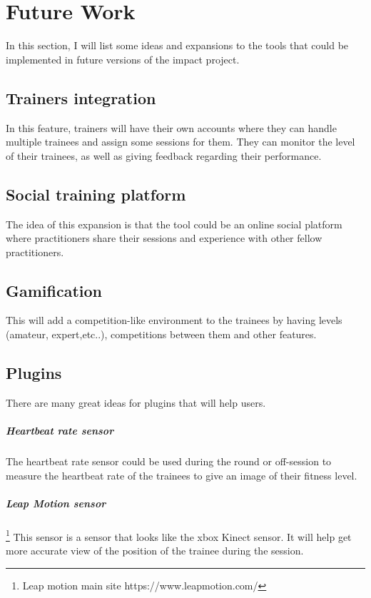\chapter{Future Work}
\label{chap:todo}

In this section, I will list some ideas and expansions to the tools that could be implemented in future versions of the impact project.

\section{Trainers integration}
In this feature, trainers will have their own accounts where they can handle multiple trainees and assign some sessions for them. They can monitor the level of their trainees, as well as giving feedback regarding their performance.

\section{Social training platform}
The idea of this expansion is that the tool could be an online social platform where practitioners share their sessions and experience with other fellow practitioners.

\section{Gamification}
This will add a competition-like environment to the trainees by having levels (amateur, expert,etc..), competitions between them and other features.

\newpage

\section{Plugins}
There are many great ideas for plugins that will help users.

\paragraph{Heartbeat rate sensor}
The heartbeat rate sensor could be used during the round or off-session to measure the heartbeat rate of the trainees to give an image of their fitness level.

\paragraph{Leap Motion sensor} \footnote{Leap motion main site https://www.leapmotion.com/}
This sensor is a sensor that looks like the xbox Kinect sensor. It will help get more accurate view of the position of the trainee during the session.
